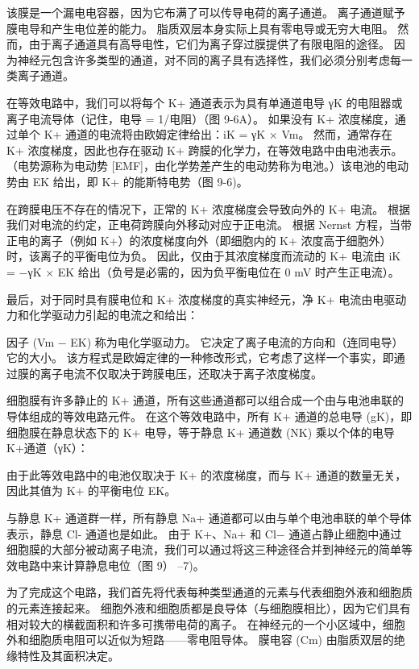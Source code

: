该膜是一个漏电电容器，因为它布满了可以传导电荷的离子通道。 
离子通道赋予膜电导和产生电位差的能力。 
脂质双层本身实际上具有零电导或无穷大电阻。 
然而，由于离子通道具有高导电性，它们为离子穿过膜提供了有限电阻的途径。 
因为神经元包含许多类型的通道，对不同的离子具有选择性，我们必须分别考虑每一类离子通道。


在等效电路中，我们可以将每个 K+ 通道表示为具有单通道电导 γK 的电阻器或离子电流导体（记住，电导 = 1/电阻）（图 9-6A）。 
如果没有 K+ 浓度梯度，通过单个 K+ 通道的电流将由欧姆定律给出：iK = γK × Vm。 
然而，通常存在 K+ 浓度梯度，因此也存在驱动 K+ 跨膜的化学力，在等效电路中由电池表示。 
（电势源称为电动势 [EMF]，由化学势差产生的电动势称为电池。）该电池的电动势由 EK 给出，即 K+ 的能斯特电势（图 9-6)。


在跨膜电压不存在的情况下，正常的 K+ 浓度梯度会导致向外的 K+ 电流。 
根据我们对电流的约定，正电荷跨膜向外移动对应于正电流。 
根据 Nernst 方程，当带正电的离子（例如 K+）的浓度梯度向外（即细胞内的 K+ 浓度高于细胞外）时，该离子的平衡电位为负。 
因此，仅由于其浓度梯度而流动的 K+ 电流由 iK = −γK × EK 给出（负号是必需的，因为负平衡电位在 0 mV 时产生正电流）。


最后，对于同时具有膜电位和 K+ 浓度梯度的真实神经元，净 K+ 电流由电驱动力和化学驱动力引起的电流之和给出：


因子 (Vm − EK) 称为电化学驱动力。 
它决定了离子电流的方向和（连同电导）它的大小。 
该方程式是欧姆定律的一种修改形式，它考虑了这样一个事实，即通过膜的离子电流不仅取决于跨膜电压，还取决于离子浓度梯度。


细胞膜有许多静止的 K+ 通道，所有这些通道都可以组合成一个由与电池串联的导体组成的等效电路元件。 
在这个等效电路中，所有 K+ 通道的总电导 (gK)，即细胞膜在静息状态下的 K+ 电导，等于静息 K+ 通道数 (NK) 乘以个体的电导 K+通道（γK）：


由于此等效电路中的电池仅取决于 K+ 的浓度梯度，而与 K+ 通道的数量无关，因此其值为 K+ 的平衡电位 EK。


与静息 K+ 通道群一样，所有静息 Na+ 通道都可以由与单个电池串联的单个导体表示，静息 Cl- 通道也是如此。 
由于 K+、Na+ 和 Cl− 通道占静止细胞中通过细胞膜的大部分被动离子电流，我们可以通过将这三种途径合并到神经元的简单等效电路中来计算静息电位（图 9） –7)。


为了完成这个电路，我们首先将代表每种类型通道的元素与代表细胞外液和细胞质的元素连接起来。 
细胞外液和细胞质都是良导体（与细胞膜相比），因为它们具有相对较大的横截面积和许多可携带电荷的离子。 
在神经元的一个小区域中，细胞外和细胞质电阻可以近似为短路——零电阻导体。 
膜电容 (Cm) 由脂质双层的绝缘特性及其面积决定。


